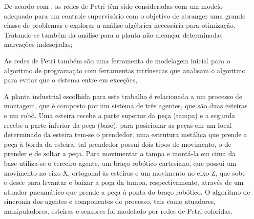 De acordo com
, as redes de Petri têm sido consideradas com um modelo adequado para um controle supervisório com o objetivo de abranger uma grande classe de problemas e explorar a análise algébrica necessária para otimização. Tratando-se também da análise para a planta não alcançar determinadas marcações indesejadas;

As redes de Petri também são uma ferramenta de modelagem inicial para o algoritmo de programação com ferramentas intrínsecas que analisam o algoritmo para evitar que o sistema entre em exceções,


A planta industrial escolhida para este trabalho é relacionada a um processo de montagem, que é composto por um sistema de três agentes, que são duas esteiras e um robô. Uma esteira recebe a parte superior da peça (tampa) e a segunda recebe a parte inferior da peça (base), para posicionar as peças em um local determinado da esteira tem-se o prendedor, uma estrutura metálica que prende a peça à borda da esteira, tal prendedor possui dois tipos de movimento, o de prender e de soltar a peça. Para movimentar a tampa e montá-la em cima da base utiliza-se  o terceiro agente, um braço robótico cartesiano, que possui um movimento no eixo X, ortogonal às esteiras e um movimento no eixo Z, que sobe e desce para levantar e baixar a peça da tampa, respectivamente, através de um atuador pneumático que prende a peça à ponta do braço robótico. O algoritmo de sincronia dos agentes e componentes do processo, tais como atuadores, manipuladores, esteiras e sensores foi modelado por redes de Petri coloridas.


